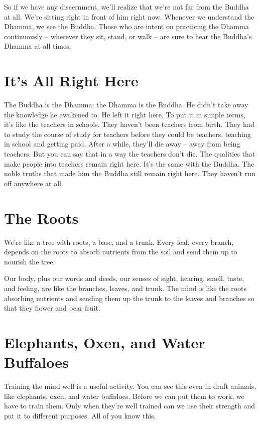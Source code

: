 So if we have any discernment, we'll realize that we're not far from the Buddha at all. We're sitting right in front of him right now. Whenever we understand the Dhamma, we see the Buddha. Those who are intent on practicing the Dhamma continuously -- wherever they sit, stand, or walk -- are sure to hear the Buddha's Dhamma at all times.

\clearpage

\section{It's All Right Here}

The Buddha is the Dhamma; the Dhamma is the Buddha. He didn't take away the knowledge he awakened to. He left it right here. To put it in simple terms, it's like the teachers in schools. They haven't been teachers from birth. They had to study the course of study for teachers before they could be teachers, teaching in school and getting paid. After a while, they'll die away -- away from being teachers. But you can say that in a way the teachers don't die. The qualities that make people into teachers remain right here. It's the same with the Buddha. The noble truths that made him the Buddha still remain right here. They haven't run off anywhere at all.

\section{The Roots}

We're like a tree with roots, a base, and a trunk. Every leaf, every branch, depends on the roots to absorb nutrients from the soil and send them up to nourish the tree.

Our body, plus our words and deeds, our senses of sight, hearing, smell, taste, and feeling, are like the branches, leaves, and trunk. The mind is like the roots absorbing nutrients and sending them up the trunk to the leaves and branches so that they flower and bear fruit.

\clearpage

\section{Elephants, Oxen, and Water Buffaloes}

Training the mind well is a useful activity. You can see this even in draft animals, like elephants, oxen, and water buffaloes. Before we can put them to work, we have to train them. Only when they're well trained can we use their strength and put it to different purposes. All of you know this. 

